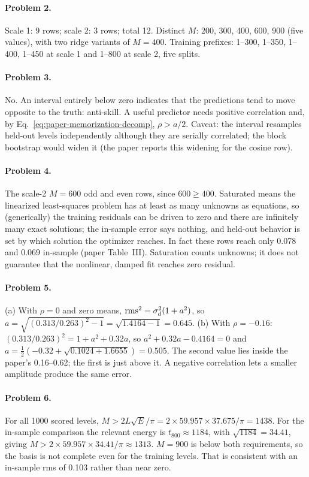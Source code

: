 \paragraph{Problem 2.} Scale 1: 9 rows; scale 2: 3 rows; total 12. Distinct $M$: 200, 300, 400, 600, 900 (five values), with two ridge variants of $M=400$. Training prefixes: 1--300, 1--350, 1--400, 1--450 at scale 1 and 1--800 at scale 2, five splits.

\paragraph{Problem 3.} No. An interval entirely below zero indicates that the predictions tend to move opposite to the truth: anti-skill. A useful predictor needs positive correlation and, by Eq.~\eqref{eq:paper-memorization-decomp}, $\rho>a/2$. Caveat: the interval resamples held-out levels independently although they are serially correlated; the block bootstrap would widen it (the paper reports this widening for the cosine row).

\paragraph{Problem 4.} The scale-2 $M=600$ odd and even rows, since $600\ge400$. Saturated means the linearized least-squares problem has at least as many unknowns as equations, so (generically) the training residuals can be driven to zero and there are infinitely many exact solutions; the in-sample error says nothing, and held-out behavior is set by which solution the optimizer reaches. In fact these rows reach only 0.078 and 0.069 in-sample (paper Table~III). Saturation counts unknowns; it does not guarantee that the nonlinear, damped fit reaches zero residual.

\paragraph{Problem 5.} (a) With $\rho=0$ and zero means, $\mathrm{rms}^2=\sigma_d^2(1+a^2)$, so $a=\sqrt{(0.313/0.263)^2-1}=\sqrt{1.4164-1}=0.645$. (b) With $\rho=-0.16$: $(0.313/0.263)^2=1+a^2+0.32a$, so $a^2+0.32a-0.4164=0$ and $a=\tfrac12\left(-0.32+\sqrt{0.1024+1.6655}\right)=0.505$. The second value lies inside the paper's 0.16--0.62; the first is just above it. A negative correlation lets a smaller amplitude produce the same error.

\paragraph{Problem 6.} For all 1000 scored levels, $M>2L\sqrt E/\pi=2\times59.957\times37.675/\pi=1438$. For the in-sample comparison the relevant energy is $t_{800}\approx1184$, with $\sqrt{1184}=34.41$, giving $M>2\times59.957\times34.41/\pi\approx1313$. $M=900$ is below both requirements, so the basis is not complete even for the training levels. That is consistent with an in-sample rms of 0.103 rather than near zero.

